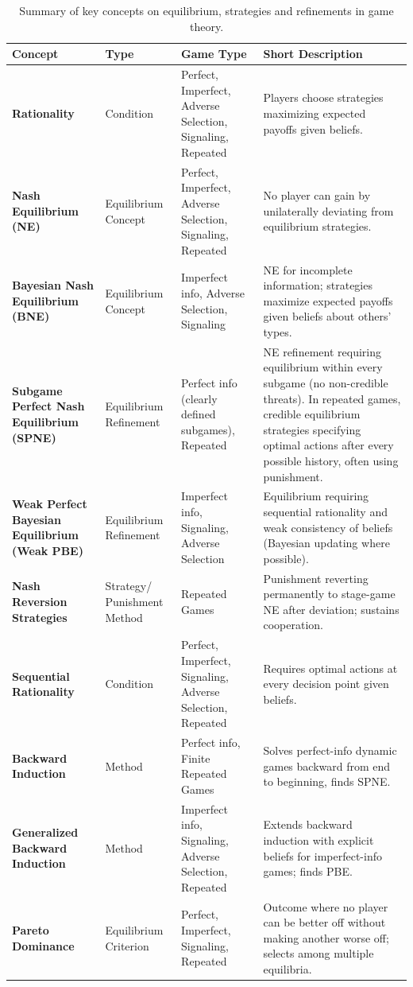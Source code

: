 \documentclass{article}
\begin{document}
\begin{table}[htbp]
\centering
\small
\renewcommand{\arraystretch}{1.5}
\begin{tabular}{|p{3.5cm}|p{2.1cm}|p{4.1cm}|p{5.7cm}|}
\hline
\textbf{Concept} & \textbf{Type} & \textbf{Game Type} & \textbf{Short Description} \\ \hline
\textbf{Rationality} & Condition & Perfect, Imperfect, Adverse Selection, Signaling, Repeated & Players choose strategies maximizing expected payoffs given beliefs. \\ \hline
\textbf{Nash Equilibrium (NE)} & Equilibrium Concept & Perfect, Imperfect, Adverse Selection, Signaling, Repeated & No player can gain by unilaterally deviating from equilibrium strategies. \\ \hline
\textbf{Bayesian Nash Equilibrium (BNE)} & Equilibrium Concept & Imperfect info, Adverse Selection, Signaling & NE for incomplete information; strategies maximize expected payoffs given beliefs about others' types. \\ \hline
\textbf{Subgame Perfect Nash Equilibrium (SPNE)} & Equilibrium Refinement & Perfect info (clearly defined subgames), Repeated & NE refinement requiring equilibrium within every subgame (no non-credible threats). In repeated games, credible equilibrium strategies specifying optimal actions after every possible history, often using punishment. \\ \hline
\textbf{Weak Perfect Bayesian Equilibrium (Weak PBE)} & Equilibrium Refinement & Imperfect info, Signaling, Adverse Selection & Equilibrium requiring sequential rationality and weak consistency of beliefs (Bayesian updating where possible). \\ \hline
\textbf{Nash Reversion Strategies} & Strategy/ Punishment Method & Repeated Games & Punishment reverting permanently to stage-game NE after deviation; sustains cooperation. \\ \hline
\textbf{Sequential Rationality} & Condition & Perfect, Imperfect, Signaling, Adverse Selection, Repeated & Requires optimal actions at every decision point given beliefs. \\ \hline
\textbf{Backward Induction} & Method & Perfect info, Finite Repeated Games & Solves perfect-info dynamic games backward from end to beginning, finds SPNE. \\ \hline
\textbf{Generalized Backward Induction} & Method & Imperfect info, Signaling, Adverse Selection, Repeated & Extends backward induction with explicit beliefs for imperfect-info games; finds PBE. \\ \hline
\textbf{Pareto Dominance} & Equilibrium Criterion & Perfect, Imperfect, Signaling, Repeated & Outcome where no player can be better off without making another worse off; selects among multiple equilibria. \\ \hline
\end{tabular}
\caption{Summary of key concepts on equilibrium, strategies and refinements in game theory.}
\label{tab:game_theory_summary}
\end{table}
\end{document}
